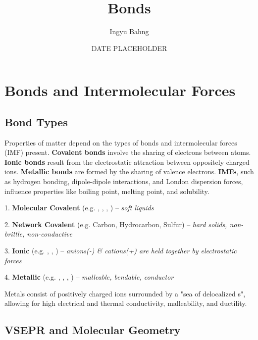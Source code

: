 \documentclass[10pt]{article}
\title{Bonds}
\date{DATE PLACEHOLDER}
\author{Ingyu Bahng}
\begin{document}


\section{Bonds and Intermolecular Forces}

  \subsection{Bond Types}

  Properties of matter depend on the types of bonds and intermolecular forces (IMF) present. \textbf{Covalent bonds} involve the sharing of electrons between atoms. \textbf{Ionic bonds} result from the electrostatic attraction between oppositely charged ions. \textbf{Metallic bonds} are formed by the sharing of valence electrons. \textbf{IMFs}, such as hydrogen bonding, dipole-dipole interactions, and London dispersion forces, influence properties like boiling point, melting point, and solubility.

  1. \textbf{Molecular Covalent} (e.g. , , , ) -- \textit{soft liquids}


  2. \textbf{Network Covalent} (e.g. Carbon, Hydrocarbon, Sulfur) -- \textit{hard solids, non-brittle, non-conductive}

  
  3. \textbf{Ionic} (e.g. , , ) -- \textit{anions(-) \& cations(+) are held together by electrostatic forces}


  4. \textbf{Metallic} (e.g. , , , ) -- \textit{malleable, bendable, conductor}

  Metals consist of positively charged ions surrounded by a "sea of delocalized s", allowing for high electrical and thermal conductivity, malleability, and ductility.


  \subsection{VSEPR and Molecular Geometry}
  
\end{document}
